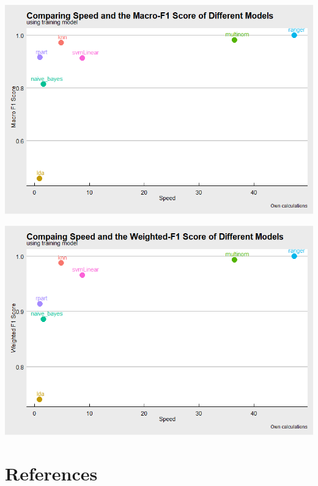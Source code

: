 \documentclass[11pt,preprint, authoryear]{elsarticle}
\let\origfigure\figure
\let\endorigfigure\endfigure
\renewenvironment{figure}[1][2] {
    \expandafter\origfigure\expandafter[H]
} {
    \endorigfigure
}
\numberwithin{equation}{section}
\numberwithin{figure}{section}
\numberwithin{table}{section}
\begin{document}
\begin{figure}
\centerline{\includegraphics[scale=0.65]{macroF1.png}}
\caption{Speed versus Macro F1 }
\end{figure}

\begin{figure}
\centerline{\includegraphics[scale=0.65]{weightedF1.png}}
\caption{Speed versus Weighted F1 }
\end{figure}

\newpage

\hypertarget{references}{%
\section*{References}\label{references}}
\end{document}
